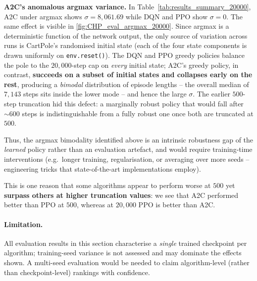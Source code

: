 \documentclass{article}
\theoremstyle{plain}
\theoremstyle{definition}
\theoremstyle{remark}
\begin{document}
\textbf{A2C's anomalous argmax variance.}
In Table~\ref{tab:results_summary_20000}, A2C under argmax shows $\sigma = 8{,}061.69$ while DQN and PPO show $\sigma = 0$. The same effect is visible in \autoref{fig:CHP_eval_argmax_20000}. Since argmax is a deterministic function of the network output, the only source of variation across runs is CartPole's randomised initial state (each of the four state components is drawn uniformly on \texttt{env.reset()}). The DQN and PPO greedy policies balance the pole to the $20{,}000$-step cap on \emph{every} initial state; A2C's greedy policy, in contrast, \textbf{succeeds on a subset of initial states and collapses early on the rest}, producing a \emph{bimodal} distribution of episode lengths -- the overall median of $7{,}143$ steps sits inside the lower mode -- and hence the large $\sigma$. The earlier $500$-step truncation hid this defect: a marginally robust policy that would fall after $\sim\!600$ steps is indistinguishable from a fully robust one once both are truncated at $500$.

Thus, the argmax bimodality identified above is an intrinsic robustness gap of the \emph{learned} policy rather than an evaluation artefact, and would require training-time interventions (e.g.\ longer training, regularisation, or averaging over more seeds -- engineering tricks that state-of-the-art implementations employ).

This is one reason that some algorithms appear to perform worse at $500$ yet \textbf{surpass others at higher truncation values}: we see that A2C performed better than PPO at $500$, whereas at $20{,}000$ PPO is better than A2C.

\paragraph{Limitation.} All evaluation results in this section characterise a \emph{single} trained checkpoint per algorithm; training-seed variance is not assessed and may dominate the effects shown. A multi-seed evaluation would be needed to claim algorithm-level (rather than checkpoint-level) rankings with confidence.
\end{document}
